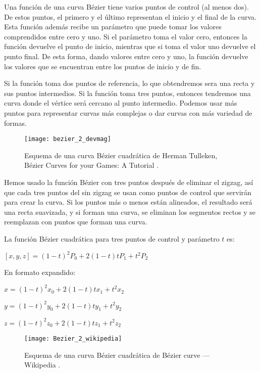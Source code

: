 Una función de una curva Bézier tiene varios puntos de control (al menos dos). De estos puntos, el primero y el último representan el inicio y el final de la curva. Esta función además recibe un parámetro que puede tomar los valores comprendidos entre cero y uno. Si el parámetro toma el valor cero, entonces la función devuelve el punto de inicio, mientras que si toma el valor uno devuelve el punto final. De esta forma, dando valores entre cero y uno, la función devuelve los valores que se encuentran entre los puntos de inicio y de fin.

Si la función toma dos puntos de referencia, lo que obtendremos sera una recta y sus puntos intermedios. Si la función toma tres puntos, entonces tendremos una curva donde el vértice será cercano al punto intermedio. Podemos usar más puntos para representar curvas más complejas o dar curvas con más variedad de formas.

\begin{figure}[htpb]
    \centering
    \texttt{[image: bezier\_2\_devmag]}
    \caption[Esquema de una curva Bézier cuadrática de Herman Tulleken]{Esquema de una curva Bézier cuadrática de Herman Tulleken, Bézier Curves for your Games: A Tutorial \cite{bezierdevmag_imagen}.}
    \label{fig:basics AFM sketch}
\end{figure}

Hemos usado la función Bézier con tres puntos después de eliminar el zigzag, así que cada tres puntos del \Astar sin zigzag se usan como puntos de control que servirán para crear la curva. Si los puntos más o menos están alineados, el resultado será una recta suavizada, y si forman una curva, se eliminan los segmentos rectos y se reemplazan con puntos que forman una curva. 

La función Bézier cuadrática para tres puntos de control y parámetro $t$ es:

\begin{center}
$[x, y, z] = (1 - t)^2P_0 + 2(1 - t)tP_1 + t^2P_2$
\end{center}

En formato expandido:
\begin{center}
$x = (1 - t)^2x_0 + 2(1 - t)tx_1 + t^2x_2$

$y = (1 - t)^2y_0 + 2(1 - t)ty_1 + t^2y_2$

$z = (1 - t)^2z_0 + 2(1 - t)tz_1 + t^2z_2$
\end{center}

\begin{figure}[htpb]
    \centering
    \texttt{[image: Bezier\_2\_wikipedia]}
    \caption[Esquema de una curva Bézier cuadrática, Wikipedia]{Esquema de una curva Bézier cuadrática de Bézier curve --- Wikipedia \cite{wiki:bezierimagen}.}
    \label{fig:basics AFM sketch}
\end{figure}

